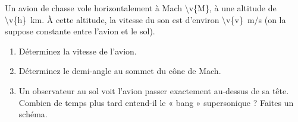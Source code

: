 Un avion de chasse vole horizontalement à Mach \num{\v{M}}, à une altitude de \qty{\v{h}}{km}. À cette altitude, la vitesse du son est d'environ \qty{\v{v}}{m/s} (on la suppose constante entre l'avion et le sol).

\begin{enumerate}[label=\alph*)]
    \item Déterminez la vitesse de l'avion.
    \item Déterminez le demi-angle au sommet du cône de Mach.
    \item Un observateur au sol voit l'avion passer exactement au-dessus de sa tête. Combien de temps plus tard entend-il le « bang » supersonique ? Faites un schéma.
\end{enumerate}

